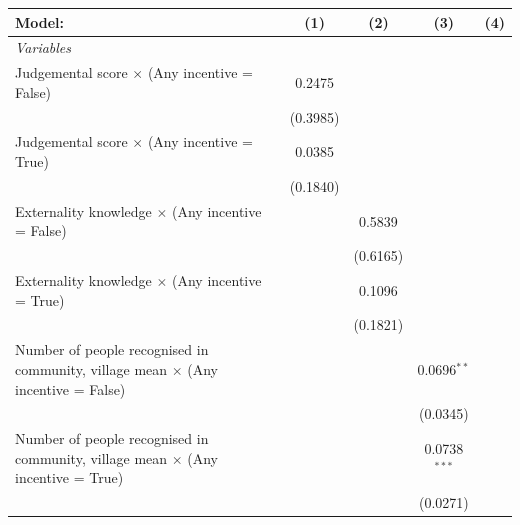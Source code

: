 \documentclass[
]{article}
\begin{document}
\newpage
\begin{landscape}

\begin{table}

\begingroup
\centering
\begin{tabular}{lcccc}
   \tabularnewline \midrule \midrule
   Model:                                                                                   & (1)      & (2)      & (3)            & (4)\\  
   \midrule
   \emph{Variables}\\
   Judgemental score $\times$ (Any incentive = False)                                       & 0.2475   &          &                &   \\   
                                                                                            & (0.3985) &          &                &   \\   
   Judgemental score $\times$ (Any incentive = True)                                        & 0.0385   &          &                &   \\   
                                                                                            & (0.1840) &          &                &   \\   
   Externality knowledge $\times$ (Any incentive = False)                                   &          & 0.5839   &                &   \\   
                                                                                            &          & (0.6165) &                &   \\   
   Externality knowledge $\times$ (Any incentive = True)                                    &          & 0.1096   &                &   \\   
                                                                                            &          & (0.1821) &                &   \\   
   Number of people recognised in community, village mean $\times$ (Any incentive = False)  &          &          & 0.0696$^{**}$  &   \\   
                                                                                            &          &          & (0.0345)       &   \\   
   Number of people recognised in community, village mean $\times$ (Any incentive = True)   &          &          & 0.0738$^{***}$ &   \\   
                                                                                            &          &          & (0.0271)       &   \\   

\end{tabular}
\end{table}
\end{landscape}
\end{document}
